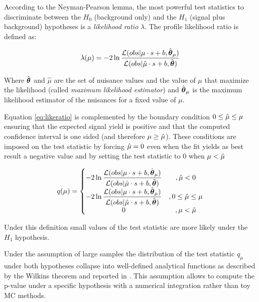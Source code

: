 
According to the Neyman-Pearson lemma, the most powerful test statistics to discriminate between the $H_0$ (background only) and the $H_1$ (signal plus background) hypotheses is a \emph{likelihood ratio} $\lambda$. The profile likelihood ratio is defined as:

\begin{equation}
\label{eq:likeratio}
\lambda(\mu) = -2 \operatorname{ln} \dfrac{\mathcal{L}(obs | \mu \cdot s + b, \hat{\boldsymbol\theta}_\mu)}{\mathcal{L}(obs | \hat{\mu} \cdot s + b, \hat{\boldsymbol\theta})}
\end{equation}

Where $\hat{\boldsymbol\theta}$ and $\hat{\mu}$ are the set of nuisance values and the value of $\mu$ that maximize the likelihood (called \emph{maximum likelihood estimator}) and $\hat{\boldsymbol\theta}_\mu$ is the maximum likelihood estimator of the nuisances for a fixed value of $\mu$.

Equation \ref{eq:likeratio} is complemented by the boundary condition $0 \leq \hat{\mu} \leq \mu$ ensuring that the expected signal yield is positive and that the computed confidence interval is one sided (and therefore $\mu \geq \hat{\mu}$). These conditions are imposed on the test statistic by forcing $\hat{\mu} = 0$ even when the fit yields as best result a negative value and by setting the test statistic to 0 when $\mu < \hat{\mu}$

\begin{equation}
q(\mu) = \left\{\begin{matrix}
-2 \operatorname{ln} \dfrac{\mathcal{L}(obs | \mu \cdot s + b, \hat{\boldsymbol\theta}_\mu)}{\mathcal{L}(obs | \hat{\mu} \cdot s + b, \hat{\boldsymbol\theta})} & , \hat{\mu} < 0\\ 
-2 \operatorname{ln} \dfrac{\mathcal{L}(obs | \mu \cdot s + b, \hat{\boldsymbol\theta}_\mu)}{\mathcal{L}(obs | \hat{\mu} \cdot s + b, \hat{\boldsymbol\theta})} & ,0 \leq \hat{\mu} \leq \mu \\ 
0 & , \mu < \hat{\mu}
\end{matrix}\right.
\label{eq:test_stat}
\end{equation}

Under this definition small values of the test statistic are more likely under the $H_1$ hypothesis.

Under the assumption of large samples the distribution of the test statistic $q_\mu$ under both hypotheses collapse into well-defined analytical functions as described by the Wilkins theorem and reported in \cite{Cowan:2010js, higgscombo}. This assumption allows to compute the p-value under a specific hypothesis with a numerical integration rather than toy MC methods.

